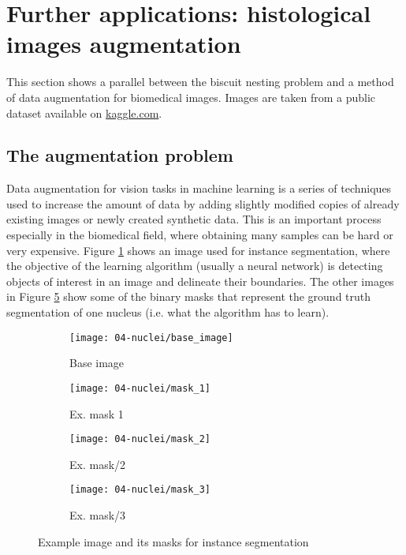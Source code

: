 
\section{Further applications: histological images augmentation}
This section shows a parallel between the biscuit nesting problem and a method of data augmentation for biomedical images. Images are taken from a public dataset available on \href{https://www.kaggle.com/competitions/data-science-bowl-2018/data}{kaggle.com}.

\subsection{The augmentation problem}
Data augmentation for vision tasks in machine learning is a series of techniques used to increase the amount of data by adding slightly modified copies of already existing images or newly created synthetic data. This is an important process especially in the biomedical field, where obtaining many samples can be hard or very expensive. Figure \ref{fig:base_image} shows an image used for instance segmentation, where the objective of the learning algorithm (usually a neural network) is detecting objects of interest in an image and delineate their boundaries. The other images in Figure \ref{fig:image_masks} show some of the binary masks that represent the ground truth segmentation of one nucleus (i.e. what the algorithm has to learn).

\begin{figure}[H]
	\centering
	\begin{subfigure}[b]{.24\textwidth}
		\centering
		\texttt{[image: 04-nuclei/base\_image]}
		\caption{Base image}
		\label{fig:base_image}
	\end{subfigure}
	\begin{subfigure}[b]{.24\textwidth}
		\centering
		\texttt{[image: 04-nuclei/mask\_1]}
		\caption{Ex. mask 1}
		\label{fig:mask_1}
	\end{subfigure} 
	\begin{subfigure}[b]{.24\textwidth}
		\centering
		\texttt{[image: 04-nuclei/mask\_2]}
		\caption{Ex. mask/2}
		\label{fig:mask_2}
	\end{subfigure}
	\begin{subfigure}[b]{.24\textwidth}
		\centering
		\texttt{[image: 04-nuclei/mask\_3]}
		\caption{Ex. mask/3}
		\label{fig:mask_3}
	\end{subfigure}	
	\caption{Example image and its masks for instance segmentation}
	\label{fig:image_masks}
\end{figure}

